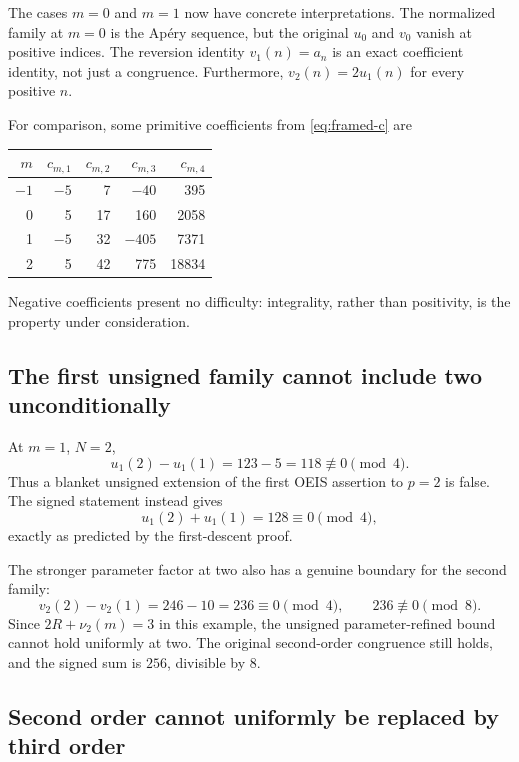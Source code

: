 \documentclass[11pt,letterpaper]{article}
\numberwithin{equation}{section}
\theoremstyle{definition}
\begin{document}
The cases $m=0$ and $m=1$ now have concrete interpretations.
The normalized family at $m=0$ is the Ap\'ery sequence, but the original
$u_0$ and $v_0$ vanish at positive indices. The reversion identity
$v_1(n)=a_n$ is an exact coefficient identity, not just a congruence.
Furthermore, $v_2(n)=2u_1(n)$ for every positive $n$.

For comparison, some primitive coefficients from
\eqref{eq:framed-c} are
\begin{center}
\small
\begin{tabular}{r r r r r}
\toprule
$m$ & $c_{m,1}$ & $c_{m,2}$ & $c_{m,3}$ & $c_{m,4}$\\
\midrule
$-1$ & $-5$ & 7 & $-40$ & 395\\
0 & 5 & 17 & 160 & 2058\\
1 & $-5$ & 32 & $-405$ & 7371\\
2 & 5 & 42 & 775 & 18834\\
\bottomrule
\end{tabular}
\end{center}
Negative coefficients present no difficulty: integrality, rather than
positivity, is the property under consideration.

\subsection{The first unsigned family cannot include two unconditionally}

At $m=1$, $N=2$,
\[
u_1(2)-u_1(1)=123-5=118\not\equiv0\pmod4.
\]
Thus a blanket unsigned extension of the first OEIS assertion to $p=2$
is false. The signed statement instead gives
\[
u_1(2)+u_1(1)=128\equiv0\pmod4,
\]
exactly as predicted by the first-descent proof.

The stronger parameter factor at two also has a genuine boundary for
the second family:
\[
v_2(2)-v_2(1)=246-10=236\equiv0\pmod4,
\qquad236\not\equiv0\pmod8.
\]
Since $2R+\nu_2(m)=3$ in this example, the unsigned parameter-refined
bound cannot hold uniformly at two. The original second-order
congruence still holds, and the signed sum is $256$, divisible by $8$.

\subsection{Second order cannot uniformly be replaced by third order}
\end{document}
